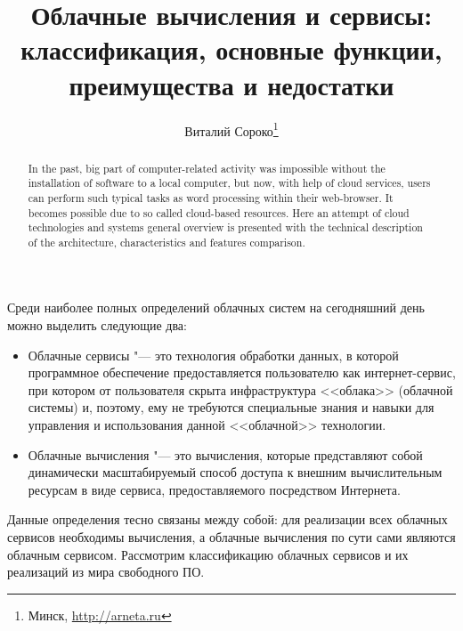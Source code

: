 \documentclass[a5paper,10pt]{article}
\begin{document}
\title{Облачные вычисления и сервисы: классификация, основные функции, преимущества и недостатки}

\author{Виталий Сороко\footnote{Минск, \url{http://arneta.ru}}}

\maketitle
\begin{abstract}
In the past, big part of computer-related activity was impos\-sible without the installation of software to a local computer, but now, with help of cloud services, users can perform such typical tasks as word processing within their web-browser. It becomes possible due to so called cloud-based resources. Here an attempt of  cloud technologies and systems general overview is presented with the technical description of the architecture, characteristics and features comparison. 
\end{abstract}

Среди наиболее полных определений облачных систем на сегодняшний день можно выделить следующие два:
\begin{itemize}
\item Облачные сервисы "--- это технология обработки данных, в которой программное обеспечение предоставляется пользователю как интернет-сервис, при котором от пользователя скрыта инфраструктура <<облака>> (облачной системы) и, поэтому, ему не требуются специальные знания и навыки для  управления и использования данной <<облачной>> технологии.
\item Облачные вычисления "--- это вычисления, которые представляют собой динамически масштабируемый способ доступа к внешним вычислительным ресурсам в виде сервиса, предоставляемого посредством Интернета.
\end{itemize}

Данные определения тесно связаны между собой: для реализации всех облачных сервисов необходимы вычисления, а облачные вычисления по сути сами являются облачным сервисом. Рассмотрим классификацию облачных сервисов и их реализаций из мира свободного ПО.
\end{document}
